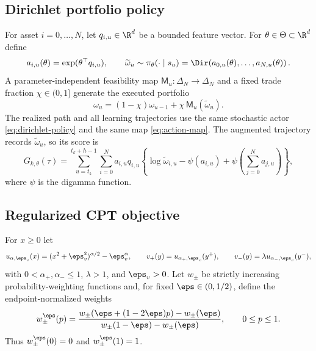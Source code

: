 \subsection{Dirichlet portfolio policy}

For asset $i=0,\ldots,N$, let $q_{i,u}\in\R^d$ be a bounded feature vector.  For $\theta\in\Theta\subset\R^d$ define
\begin{equation}\label{eq:dirichlet-policy}
 a_{i,u}(\theta)=\exp(\theta^\top q_{i,u}),
 \qquad
 \widetilde\omega_u\sim
 \pi_\theta(\cdot\mid s_u)
 =\Dir\!\left(a_{0,u}(\theta),\ldots,a_{N,u}(\theta)\right).
\end{equation}
A parameter-independent feasibility map $\mathsf M_u:\Delta_N\to\Delta_N$ and a fixed trade fraction $\chi\in(0,1]$ generate the executed portfolio
\begin{equation}\label{eq:action-map}
 \omega_u=(1-\chi)\omega_{u-1}+\chi\,\mathsf M_u(\widetilde\omega_u).
\end{equation}
The realized path and all learning trajectories use the same stochastic actor \eqref{eq:dirichlet-policy} and the same map \eqref{eq:action-map}.  The augmented trajectory records $\widetilde\omega_u$, so its score is
\begin{equation}\label{eq:trajectory-score}
 G_{k,\theta}(\tau)
 =\sum_{u=t_k}^{t_k+h-1}\sum_{i=0}^{N}
 a_{i,u}q_{i,u}
 \left\{\log\widetilde\omega_{i,u}
 -\psi(a_{i,u})+\psi\!\left(\sum_{j=0}^{N}a_{j,u}\right)\right\},
\end{equation}
where $\psi$ is the digamma function.

\subsection{Regularized CPT objective}

For $x\ge0$ let
\begin{equation}\label{eq:value-functions}
 u_{\alpha,\eps_v}(x)=(x^2+\eps_v^2)^{\alpha/2}-\eps_v^\alpha,
 \qquad
 v_+(y)=u_{\alpha_+,\eps_v}(y^+),
 \qquad
 v_-(y)=\lambda u_{\alpha_-,\eps_v}(y^-),
\end{equation}
with $0<\alpha_+,\alpha_-\le1$, $\lambda>1$, and $\eps_v>0$.  Let $w_\pm$ be strictly increasing probability-weighting functions and, for fixed $\eps\in(0,1/2)$, define the endpoint-normalized weights
\begin{equation}\label{eq:normalized-weight}
 w_\pm^\eps(p)
 =\frac{w_\pm(\eps+(1-2\eps)p)-w_\pm(\eps)}
 {w_\pm(1-\eps)-w_\pm(\eps)},
 \qquad 0\le p\le1.
\end{equation}
Thus $w_\pm^\eps(0)=0$ and $w_\pm^\eps(1)=1$.

